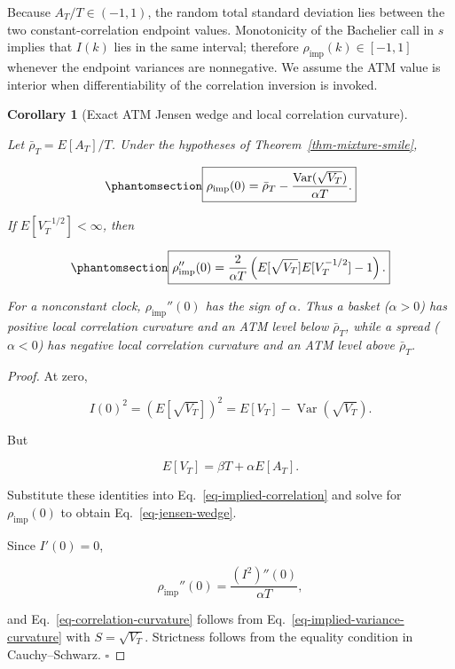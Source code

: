 \documentclass[
  english,
  11pt,
  letterpaper,
  DIV=11,
  numbers=noendperiod]{scrartcl}
\theoremstyle{plain}
\theoremstyle{plain}
\newtheorem{corollary}{Corollary}[section]
\theoremstyle{plain}
\theoremstyle{plain}
\theoremstyle{remark}
\begin{document}
Because \(A_T/T\in(-1,1)\), the random total standard deviation lies
between the two constant-correlation endpoint values. Monotonicity of
the Bachelier call in \(s\) implies that \(I(k)\) lies in the same
interval; therefore \(\rho_{\mathrm{imp}}(k)\in[-1,1]\) whenever the
endpoint variances are nonnegative. We assume the ATM value is interior
when differentiability of the correlation inversion is invoked.

\begin{corollary}[Exact ATM Jensen wedge and local correlation
curvature]\protect\hypertarget{cor-jensen-wedge}{}\label{cor-jensen-wedge}

Let \(\bar\rho_T=E[A_T]/T\). Under the hypotheses of
Theorem~\ref{thm-mixture-smile},

\begin{equation}\protect\phantomsection\label{eq-jensen-wedge}{
\boxed{
\rho_{\mathrm{imp}}(0)
=\bar\rho_T
-\frac{\operatorname{Var}(\sqrt{V_T})}{\alpha T}.
}
}\end{equation}

If \(E[V_T^{-1/2}]<\infty\), then

\begin{equation}\protect\phantomsection\label{eq-correlation-curvature}{
\boxed{
\rho_{\mathrm{imp}}''(0)
=\frac{2}{\alpha T}
\left(
E[\sqrt{V_T}]E[V_T^{-1/2}]-1
\right).
}
}\end{equation}

For a nonconstant clock, \(\rho_{\mathrm{imp}}''(0)\) has the sign of
\(\alpha\). Thus a basket (\(\alpha>0\)) has positive local correlation
curvature and an ATM level below \(\bar\rho_T\), while a spread
(\(\alpha<0\)) has negative local correlation curvature and an ATM level
above \(\bar\rho_T\).

\end{corollary}

\begin{proof}
At zero,

\[
I(0)^2
=(E[\sqrt{V_T}])^2
=E[V_T]-\operatorname{Var}(\sqrt{V_T}).
\]

But

\[
E[V_T]=\beta T+\alpha E[A_T].
\]

Substitute these identities into Eq.~\ref{eq-implied-correlation} and
solve for \(\rho_{\mathrm{imp}}(0)\) to obtain
Eq.~\ref{eq-jensen-wedge}.

Since \(I'(0)=0\),

\[
\rho_{\mathrm{imp}}''(0)
=\frac{(I^2)''(0)}{\alpha T},
\]

and Eq.~\ref{eq-correlation-curvature} follows from
Eq.~\ref{eq-implied-variance-curvature} with \(S=\sqrt{V_T}\).
Strictness follows from the equality condition in Cauchy--Schwarz.
\(\square\)
\end{proof}
\end{document}
